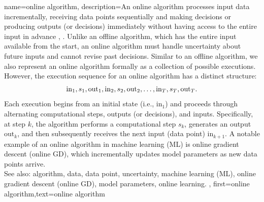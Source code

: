 {name={online algorithm},
	description={An online algorithm processes input data incrementally, 
		receiving data points sequentially and making decisions or producing outputs (or decisions) immediately 
		without having access to the entire input in advance \cite{PredictionLearningGames}, \cite{HazanOCO}. 
		Unlike an offline algorithm, which has the entire input available from the start, an online algorithm 
		must handle uncertainty about future inputs and cannot revise past decisions. Similar to an 
		offline algorithm, we also represent an online algorithm formally as a collection of possible 
		executions. However, the execution sequence for an online algorithm has a distinct structure:
		$${\rm in}_{1},s_1,{\rm out}_{1},{\rm in}_{2},s_2,{\rm out}_{2},\ldots,{\rm in}_{T},s_T,{\rm out}_{T}.$$ 
		Each execution begins from an initial state (i.e., \(\text{in}_{1}\)) and proceeds through alternating 
		computational steps, outputs (or decisions), and inputs. Specifically, at step \(k\), 
		the algorithm performs a computational step \(s_{k}\), generates an output \(\text{out}_{k}\), 
		and then subsequently receives the next input (data point) \(\text{in}_{k+1}\). A 
		notable example of an online algorithm in machine learning (ML) is online gradient descent (online GD), which incrementally 
		updates model parameters as new data points arrive. 
					\\ 
		See also: algorithm, data, data point, uncertainty, machine learning (ML), online gradient descent (online GD), model parameters, online learning.
	},
	first={online algorithm},text={online algorithm} 
}




